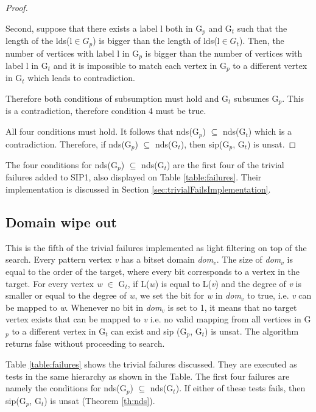 \documentclass{l4proj}
\begin{document}
\begin{proof}
\begin{enumerate}
Second, suppose that there exists a label l both in G$_{p}$ and G$_{t}$ such that the length of the \gls{lds}(l$\in G_{p}$) is bigger than the length of \gls{lds}(l$\in G_{t}$). Then, the number of vertices with label l in G$_{p}$ is bigger than the number of vertices with label l in G$_{t}$ and it is impossible to match each vertex in G$_{p}$ to a different vertex in G$_{t}$ which leads to contradiction.

Therefore both conditions of subsumption must hold and G$_{t}$ subsumes G$_{p}$. This is a contradiction, therefore condition 4 must be true.
\end{enumerate} 

All four conditions must hold. It follows that \gls{nds}(G$_{p}$) $\subseteq$ \gls{nds}(G$_{t}$) which is a contradiction. Therefore, if \gls{nds}(G$_{p}$) $\subseteq$ \gls{nds}(G$_{t}$), then \gls{sip}(G$_{p}$, G$_{t}$) is \gls{unsat}.
\end{proof}

The four conditions for \gls{nds}(G$_{p}$) $\subseteq$ \gls{nds}(G$_{t}$) are the first four of the trivial failures added to SIP1, also displayed on Table \ref{table:failures}. Their implementation is discussed in Section \ref{sec:trivialFailsImplementation}.

\subsection{Domain wipe out}
\label{sec:domainWipeout}
This is the fifth of the trivial failures implemented as light filtering on top of the search. Every pattern vertex \textit{v} has a bitset domain \textit{dom$_{v}$}. The size of \textit{dom$_{v}$} is equal to the order of the target, where every bit corresponds to a vertex in the target. For every vertex \textit{w} $\in$ G$_{t}$, if L(\textit{w}) is equal to L(\textit{v}) and the degree of \textit{v} is smaller or equal to the degree of \textit{w}, we set the bit for \textit{w} in \textit{dom$_{v}$} to true, i.e. \textit{v} can be mapped to \textit{w}. Whenever no bit in \textit{dom$_{v}$} is set to 1, it means that no target vertex exists that can be mapped to \textit{v} i.e. no valid mapping from all vertices in G$_{p}$ to a different vertex in G$_{t}$ can exist and \gls{sip} (G$_{p}$, G$_{t}$) is \gls{unsat}. The algorithm returns false without proceeding to search.

Table \ref{table:failures} shows the trivial failures discussed. They are executed as tests in the same hierarchy as shown in the Table. The first four failures are namely the conditions for \gls{nds}(G$_{p}$) $\subseteq$ \gls{nds}(G$_{t}$). If either of these tests fails, then \gls{sip}(G$_{p}$, G$_{t}$) is \gls{unsat} (Theorem \ref{th:nds}).
\end{document}
